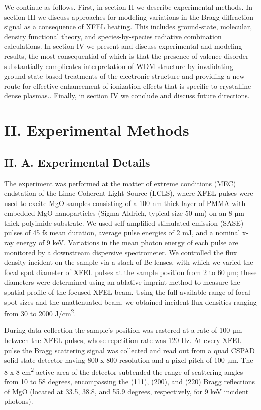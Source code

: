 We continue as follows. First, in section II we describe experimental
methods. In section III we discuss approaches for modeling variations in
the Bragg diffraction signal as a consequence of XFEL heating. This
includes ground-state, molecular, density functional theory, and
species-by-species radiative combination calculations. In section IV we
present and discuss experimental and modeling results, the most
consequential of which is that the presence of valence disorder
substantially complicates interpretation of WDM structure by
invalidating ground state-based treatments of the electronic structure
and providing a new route for effective enhancement of ionization
effects that is specific to crystalline dense plasmas.. Finally, in
section IV we conclude and discuss future directions.

\section{II. Experimental Methods}

\subsection{II. A. Experimental Details}

The experiment was performed at the matter of extreme conditions (MEC)
endstation of the Linac Coherent Light Source (LCLS), where XFEL pulses
were used to excite MgO samples consisting of a 100 nm-thick layer of
PMMA with embedded MgO nanoparticles (Sigma Aldrich, typical size 50 nm)
on an 8 µm-thick polyimide substrate. We used self-amplified stimulated
emission (SASE) pulses of 45 fs mean duration, average pulse energies of
2 mJ, and a nominal x-ray energy of 9 keV. Variations in the mean photon
energy of each pulse are monitored by a downstream dispersive
spectrometer. We controlled the flux density incident on the sample via
a stack of Be lenses, with which we varied the focal spot diameter of
XFEL pulses at the sample position from 2 to 60 µm; these diameters were
determined using an ablative imprint method to measure the spatial
profile of the focused XFEL beam.  Using the full available
range of focal spot sizes and the unattenuated beam, we obtained
incident flux densities ranging from 30 to 2000 J/cm\textsuperscript{2}.

During data collection the sample's position was rastered at a rate of
100 µm between the XFEL pulses, whose repetition rate was 120 Hz. At
every XFEL pulse the Bragg scattering signal was collected and read out
from a quad CSPAD solid state detector having 800 x 800 resolution and a
pixel pitch of 100 µm. \cite{hart2012cspad} The 8 x 8 cm\textsuperscript{2}
active area of the detector subtended the range of scattering angles
from 10 to 58 degrees, encompassing the (111), (200), and (220) Bragg
reflections of MgO (located at 33.5, 38.8, and 55.9 degrees,
respectively, for 9 keV incident photons).

